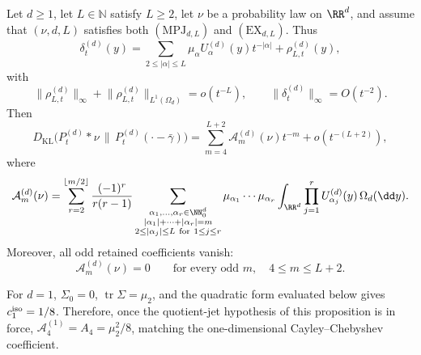 \begin{proposition}%
\label{thm:multidimensional-poisson-entropy-jets}
Let \(d\ge1\), let \(L\in\mathbb N\) satisfy \(L\ge2\), let \(\nu\) be a
probability law on \(\RR^d\), and assume that \((\nu,d,L)\) satisfies both
\((\mathrm{MPJ}_{d,L})\) and \((\mathrm{EX}_{d,L})\).  Thus
\[
\delta_t^{(d)}(y)
=\sum_{2\le\lvert\alpha\rvert\le L}
\mu_\alpha U_\alpha^{(d)}(y)t^{-\lvert\alpha\rvert}
+\rho_{L,t}^{(d)}(y),
\]
with
\[
\lVert\rho_{L,t}^{(d)}\rVert_\infty+
\lVert\rho_{L,t}^{(d)}\rVert_{L^1(\Omega_d)}=o(t^{-L}),
\qquad
\lVert\delta_t^{(d)}\rVert_\infty=O(t^{-2}).
\]
Then
\[
D_{\mathrm{KL}}\bigl(P_t^{(d)}*\nu\,\|\,P_t^{(d)}(\cdot-\bar{\gamma})\bigr)
=\sum_{m=4}^{L+2}\mathcal A_m^{(d)}(\nu)t^{-m}
+o(t^{-(L+2)}),
\]
where
\[
\mathcal A_m^{(d)}(\nu)=
\sum_{r=2}^{\lfloor m/2\rfloor}
\frac{(-1)^r}{r(r-1)}
\sum_{\substack{\alpha_1,\ldots,\alpha_r\in\NN_0^d\\
|\alpha_1|+\cdots+|\alpha_r|=m\\
2\le|\alpha_j|\le L\ \mathrm{for}\ 1\le j\le r}}
\mu_{\alpha_1}\cdots\mu_{\alpha_r}
\int_{\RR^d}\prod_{j=1}^r
U_{\alpha_j}^{(d)}(y)\,\Omega_d(\dd y).
\]
Moreover, all odd retained coefficients vanish:
\[
\mathcal A_m^{(d)}(\nu)=0
\qquad\text{for every odd }m,\quad 4\le m\le L+2.
\]
\end{proposition}

\begin{remark}
For \(d=1\), \(\Sigma_0=0\), \(\operatorname{tr}\Sigma=\mu_2\), and the
quadratic form evaluated below gives \(c_1^{\rm iso}=1/8\).  Therefore, once
the quotient-jet hypothesis of this proposition is in force,
\(\mathcal A_4^{(1)}=A_4=\mu_2^2/8\), matching the one-dimensional
Cayley--Chebyshev coefficient.
\end{remark}

